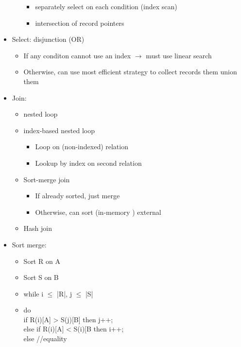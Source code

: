 \documentclass[12pt]{article}
\begin{document}
\begin{itemize}
\begin{enumerate}
						\begin{itemize}
							\item
								separately select on each condition (index scan)
							\item
								intersection of record pointers
						\end{itemize}
				\end{enumerate}
			\item
				Select: disjunction (OR)
				\begin{itemize}
					\item
						If any conditon cannot use an index $\rightarrow$ must use linear search
					\item
						Otherwise, can use most efficient strategy to collect records them union them
				\end{itemize}
			\item
				Join:
				\begin{itemize}
					\item
						nested loop
					\item
						index-based nested loop
						\begin{itemize}
							\item
								Loop on (non-indexed) relation
							\item
								Lookup by index on second relation
						\end{itemize}
					\item
						Sort-merge join
						\begin{itemize}
							\item
								If already sorted, just merge
							\item
								Otherwise, can sort (in-memory ) external
						\end{itemize}
					\item
						Hash join
				\end{itemize}
			\item
				Sort merge:
				\begin{itemize}
					\item
						Sort R on A
					\item
						Sort S on B
					\item
						while i $\leq$ |R|, j $\leq$ |S|
					\item
						do { \\
							if R(i)[A] > S(j)[B] then j++; \\
							else if R(i)[A] < S(i)[B} then i++; \\
							else //equality \\

\end{itemize}
\end{itemize}
\end{document}
